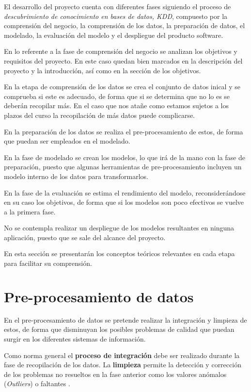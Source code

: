 El desarrollo del proyecto cuenta con diferentes fases siguiendo el proceso de \textit{descubrimiento de conocimiento
en bases de datos, KDD}, compuesto por la comprensión del negocio, la comprensión de los datos, la preparación de datos,
el modelado, la evaluación del modelo y el despliegue del producto software.


En lo referente a la fase de comprensión del negocio se analizan los objetivos y requisitos del proyecto. 
En este caso quedan bien marcados en la descripción del proyecto y la introducción, así como en la sección de los objetivos.

En la etapa de comprensión de los datos se crea el conjunto de datos inical y se comprueba si este es adecuado,
de forma que si se determina que no lo es se deberán recopilar más.
En el caso que nos atañe como estamos sujetos a los plazos del curso la recopilación de más datos puede complicarse.

En la preparación de los datos se realiza el pre-procesamiento de estos, de forma que puedan ser empleados en el modelado.

En la fase de modelado se crean los modelos, lo que irá de la mano con la fase de preparación, puesto que algunas herramientas de 
pre-procesamiento incluyen un modelo interno de los datos para transformarlos.

En la fase de la evaluación se estima el rendimiento del modelo, reconsiderándose en su caso los objetivos, de forma que si los modelos son poco efectivos
se vuelve a la primera fase.

No se contempla realizar un despliegue de los modelos resultantes en ninguna aplicación, puesto que se sale del alcance del proyecto.

En esta sección se presentarán los conceptos teóricos relevantes en cada etapa para facilitar su comprensión.

\section{Pre-procesamiento de datos}
En el pre-procesamiento de datos se pretende realizar la integración y limpieza de estos, de forma que disminuyan los posibles problemas
de calidad que puedan surgir en los diferentes sistemas de información.

Como norma general el \textbf{proceso de integración} debe ser realizado durante la fase de recopilación de los datos.
La \textbf{limpieza} permite la detección y corrección de los problemas no resueltos en la fase anterior como los valores anómalos (\textit{Outliers}) o faltantes 
\cite{book:hernandez2004}.  

